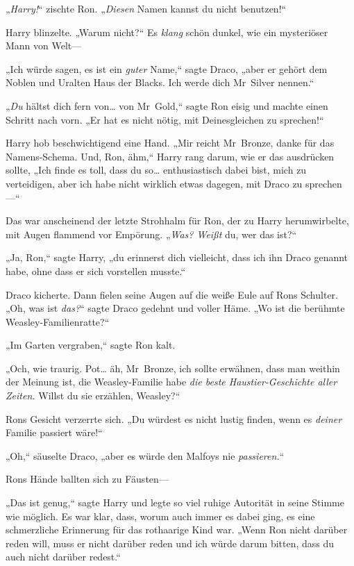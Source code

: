 {„\emph{Harry!}“ zischte Ron. „\emph{Diesen} Namen kannst du nicht benutzen!“

Harry blinzelte. „Warum nicht?“ Es \emph{klang} schön dunkel, wie ein mysteriöser Mann von Welt—

„Ich würde sagen, es ist ein \emph{guter} Name,“ sagte Draco, „aber er gehört dem Noblen und Uralten Haus der Blacks. Ich werde dich Mr~Silver nennen.“

„\emph{Du} hältst dich fern von… von Mr~Gold,“ sagte Ron eisig und machte einen Schritt nach vorn. „Er hat es nicht nötig, mit Deinesgleichen zu sprechen!“

Harry hob beschwichtigend eine Hand. „Mir reicht Mr~Bronze, danke für das Namens-Schema. Und, Ron, ähm,“ Harry rang darum, wie er das ausdrücken sollte, „Ich finde es toll, dass du so… enthusiastisch dabei bist, mich zu verteidigen, aber ich habe nicht wirklich etwas dagegen, mit Draco zu sprechen—“

Das war anscheinend der letzte Strohhalm für Ron, der zu Harry herumwirbelte, mit Augen flammend vor Empörung. „\emph{Was? Weißt} du, wer das ist?“

„Ja, Ron,“ sagte Harry, „du erinnerst dich vielleicht, dass ich ihn Draco genannt habe, ohne dass er sich vorstellen musste.“

Draco kicherte. Dann fielen seine Augen auf die weiße Eule auf Rons Schulter. „Oh, was ist \emph{das?}“ sagte Draco gedehnt und voller Häme. „Wo ist die berühmte Weasley-Familienratte?“

„Im Garten vergraben,“ sagte Ron kalt.

„Och, wie traurig. Pot… äh, Mr~Bronze, ich sollte erwähnen, dass man weithin der Meinung ist, die Weasley-Familie habe \emph{die beste Haustier-Geschichte aller Zeiten.} Willst du sie erzählen, Weasley?“

Rons Gesicht verzerrte sich. „Du würdest es nicht lustig finden, wenn es \emph{deiner} Familie passiert wäre!“

„Oh,“ säuselte Draco, „aber es würde den Malfoys nie \emph{passieren.}“

Rons Hände ballten sich zu Fäusten—

„Das ist genug,“ sagte Harry und legte so viel ruhige Autorität in seine Stimme wie möglich. Es war klar, dass, worum auch immer es dabei ging, es eine schmerzliche Erinnerung für das rothaarige Kind war. „Wenn Ron nicht darüber reden will, muss er nicht darüber reden und ich würde darum bitten, dass du auch nicht darüber redest.“

}
